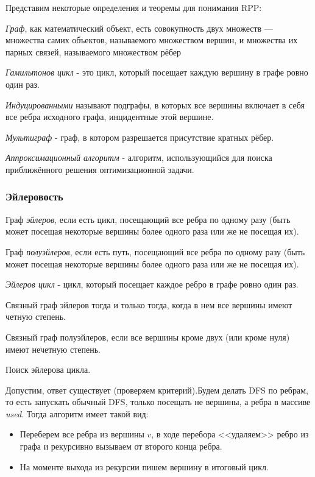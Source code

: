 Представим некоторые определения и теоремы для понимания RPP:


\textit{Граф}, как математический объект, есть совокупность двух множеств — множества самих объектов, называемого множеством вершин, и множества их парных связей, называемого множеством рёбер


\textit{Гамильтонов цикл} - это цикл, который посещает каждую вершину в графе ровно один раз.

\textit{Индуцированными} называют подграфы, в которых все вершины включает в себя все ребра исходного графа, инцидентные этой вершине.

\textit{Мультиграф} -  граф, в котором разрешается присутствие кратных рёбер.


\textit{Аппроксимационный алгоритм} -  алгоритм, использующийся для поиска приближённого решения оптимизационной задачи.

\subsubsection{Эйлеровость}


Граф \emph{эйлеров}, если есть цикл, посещающий все ребра по одному разу (быть может посещая некоторые вершины более одного раза или же не посещая их).

Граф \emph{полуэйлеров}, если есть путь, посещающий все ребра по одному разу (быть может посещая некоторые вершины более одного раза или же не посещая их).

\textit{Эйлеров цикл} - цикл, который посещает каждое ребро в графе ровно один раз.

\Thbd Связный граф эйлеров тогда и только тогда, когда в нем все вершины имеют четную степень.

\Thbd Связный граф полуэйлеров, если все вершины кроме двух (или кроме нуля) имеют нечетную степень.

\Alg Поиск эйлерова цикла.

Допустим, ответ существует (проверяем критерий).Будем делать DFS по ребрам, то есть запускать обычный DFS, только посещать не вершины, а ребра в массиве \textit{used}. Тогда алгоритм имеет такой вид:
\begin{itemize}
    \item Переберем все ребра из вершины $v$, в ходе перебора <<удаляем>> ребро из графа и рекурсивно вызываем от второго конца ребра.
    \item На моменте выхода из рекурсии пишем вершину в итоговый цикл.
\end{itemize}

